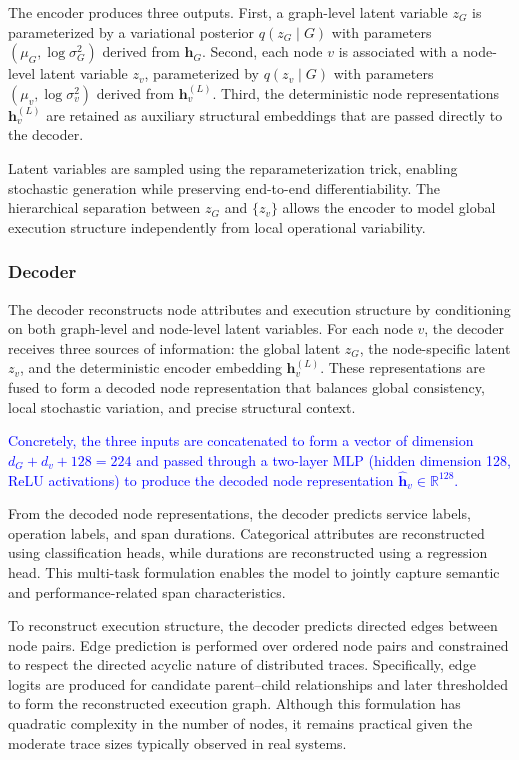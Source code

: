 \documentclass[sigconf,review]{acmart}
\begin{document}
The encoder produces three outputs. First, a graph-level latent variable $z_G$ is parameterized by a variational posterior $q(z_G \mid G)$ with parameters $(\mu_G, \log \sigma_G^2)$ derived from $\mathbf{h}_G$. Second, each node $v$ is associated with a node-level latent variable $z_v$, parameterized by $q(z_v \mid G)$ with parameters $(\mu_v, \log \sigma_v^2)$ derived from $\mathbf{h}_v^{(L)}$. Third, the deterministic node representations $\mathbf{h}_v^{(L)}$ are retained as auxiliary structural embeddings that are passed directly to the decoder.

Latent variables are sampled using the reparameterization trick, enabling stochastic generation while preserving end-to-end differentiability. The hierarchical separation between $z_G$ and $\{z_v\}$ allows the encoder to model global execution structure independently from local operational variability.

\subsubsection{Decoder}

The decoder reconstructs node attributes and execution structure by conditioning on both graph-level and node-level latent variables. For each node $v$, the decoder receives three sources of information: the global latent $z_G$, the node-specific latent $z_v$, and the deterministic encoder embedding $\mathbf{h}_v^{(L)}$. These representations are fused to form a decoded node representation that balances global consistency, local stochastic variation, and precise structural context.

\textcolor{blue}{Concretely, the three inputs are concatenated to form a vector of dimension $d_G + d_v + 128 = 224$ and passed through a two-layer MLP (hidden dimension 128, ReLU activations) to produce the decoded node representation $\hat{\mathbf{h}}_v \in \mathbb{R}^{128}$.}

From the decoded node representations, the decoder predicts service labels, operation labels, and span durations. Categorical attributes are reconstructed using classification heads, while durations are reconstructed using a regression head. This multi-task formulation enables the model to jointly capture semantic and performance-related span characteristics.

To reconstruct execution structure, the decoder predicts directed edges between node pairs. Edge prediction is performed over ordered node pairs and constrained to respect the directed acyclic nature of distributed traces. Specifically, edge logits are produced for candidate parent--child relationships and later thresholded to form the reconstructed execution graph. Although this formulation has quadratic complexity in the number of nodes, it remains practical given the moderate trace sizes typically observed in real systems.
\end{document}
